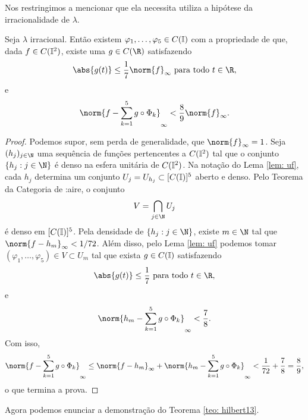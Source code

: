 Nos restringimos a mencionar que ela necessita utiliza a hipótese da irracionalidade de \( \lambda \).
\begin{lem}
    Seja \( \lambda \) irracional.
    Então existem \( \varphi_{ 1 }, \dots, \varphi_{ 5 } \in C(\mathbb{I}) \) com a propriedade de que, dada \( f \in C(\mathbb{I}^2) \), existe uma \( g \in C(\R) \) satisfazendo \[
        \abs{ g(t) } \leq \frac{ 1 }{ 7 } \norm{ f }_{ \infty } \text{ para todo } t \in \R
    ,\]
    e \[
        \norm{ 
            f - \sum_{ k=1 }^{ 5 } g \circ \Phi_{ k }
         }_{ \infty } < \frac{ 8 }{ 9 } \norm{ f }_{ \infty }
    .\]
    \label{lem: baire}
\end{lem}
\begin{proof}
    Podemos supor, sem perda de generalidade, que \( \norm{ f }_{ \infty } = 1 \).
    Seja \( (h_{ j })_{ j\in\N } \) uma sequência de funções pertencentes a \( C(\mathbb{I}^2) \) tal que o conjunto \( \left\{ h_{ j } : j\in \N \right\} \) é denso na esfera unitária de \( C(\mathbb{I}^2) \).
    Na notação do Lema \ref{lem: uf}, cada \( h_{ j } \) determina um conjunto \( U_{ j } = U_{ h_{ j } } \subset  [C(\mathbb{I})]^{ 5 } \) aberto e denso.
    Pelo Teorema da Categoria de :aire, o conjunto \[
        V = \bigcap_{ j\in\N } U_{ j }
    \]
    é denso em \( [C(\mathbb{I})]^{ 5 } \).
    Pela densidade de \( \left\{ h_{ j } : j \in \N \right\} \), existe \( m \in \N \) tal que \( \norm{ f - h_{ m } }_{ \infty } < 1/72 \).
    Além disso, pelo Lema \ref{lem: uf} podemos tomar \( ( \varphi_{ 1 }, \dots, \varphi_{ 5 } ) \in V \subset  U_{ m } \) tal que exista \( g \in C(\mathbb{I}) \) satisfazendo \[
        \abs{ g(t) } \leq \frac{ 1 }{ 7 } \text{ para todo } t \in \R
    ,\]
    e \[
        \norm{ 
            h_{ m } - \sum_{ k=1 }^{ 5 } g \circ \Phi_{ k }
         }_{ \infty } < \frac{ 7 }{ 8 }
    .\]
    Com isso, \[
        \norm{ 
            f - \sum_{ k=1 }^{ 5 } g \circ \Phi_{ k }
         }_{ \infty } \leq
        \norm{ f - h_{ m } }_{ \infty }
        + \norm{ 
            h_{ m } - \sum_{ k=1 }^{ 5 } g \circ \Phi_{ k }
         }_{ \infty }
         < \frac{ 1 }{ 72 } + \frac{ 7 }{ 8 }
         = \frac{ 8 }{ 9 }
    ,\]
    o que termina a prova.
\end{proof}
Agora podemos enunciar a demonstração do Teorema \ref{teo: hilbert13}.
